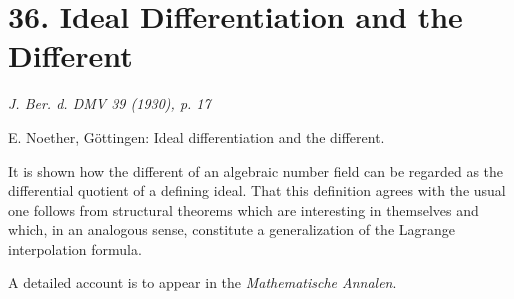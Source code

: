 \section*{36. Ideal Differentiation and the Different}

\begin{center}
\emph{J. Ber. d. DMV 39 (1930), p. 17}
\end{center}

E. Noether, Göttingen: Ideal differentiation and the different.

It is shown how the different of an algebraic number field can be regarded as the differential quotient of a defining ideal. That this definition agrees with the usual one follows from structural theorems which are interesting in themselves and which, in an analogous sense, constitute a generalization of the Lagrange interpolation formula.

A detailed account is to appear in the \emph{Mathematische Annalen}.
